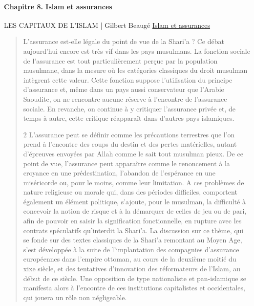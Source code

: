  
 \paragraph{Chapitre 8. Islam et assurances}
 LES CAPITAUX DE L’ISLAM  | Gilbert Beaugé
 \href{https://books.openedition.org/editionscnrs/871?lang=fr}{ Islam et assurances}
\begin{quote}
    
L’assurance est-elle légale du point de vue de la Shari’a ? Ce débat aujourd’hui encore est très vif dans les pays musulmans. La fonction sociale de l’assurance est tout particulièrement perçue par la population musulmane, dans la mesure où les catégories classiques du droit musulman intègrent cette valeur. Cette fonction suppose l’utilisation du principe d’assurance et, même dans un pays aussi conservateur que l’Arabie Saoudite, on ne rencontre aucune réserve à l’encontre de l’assurance sociale. En revanche, on continue à y critiquer l’assurance privée et, de temps à autre, cette critique réapparaît dans d’autres pays islamiques.

 
2 L’assurance peut se définir comme les précautions terrestres que l’on prend à l’encontre des coups du destin et des pertes matérielles, autant d’épreuves envoyées par Allah comme le sait tout musulman pieux. De ce point de vue, l’assurance peut apparaître comme le renoncement à la croyance en une prédestination, l’abandon de l’espérance en une miséricorde ou, pour le moins, comme leur limitation. A ces problèmes de nature religieuse ou morale qui, dans des périodes difficiles, comportent également un élément politique, s’ajoute, pour le musulman, la difficulté à concevoir la notion de risque et à la démarquer de celles de jeu ou de pari, afin de pouvoir en saisir la signification fonctionnelle, en rupture avec les contrats spéculatifs qu’interdit la Shari’a. La discussion sur ce thème, qui se fonde sur des textes classiques de la Shari’a remontant au Moyen Age, s’est développée à la suite de l’implantation des compagnies d’assurance européennes dans l’empire ottoman, au cours de la deuxième moitié du xixe siècle, et des tentatives d’innovation des réformateurs de l’Islam, au début de ce siècle. Une opposition de type nationaliste et pan-islamique se manifesta alors à l’encontre de ces institutions capitalistes et occidentales, qui jouera un rôle non négligeable.
 

\end{quote}
